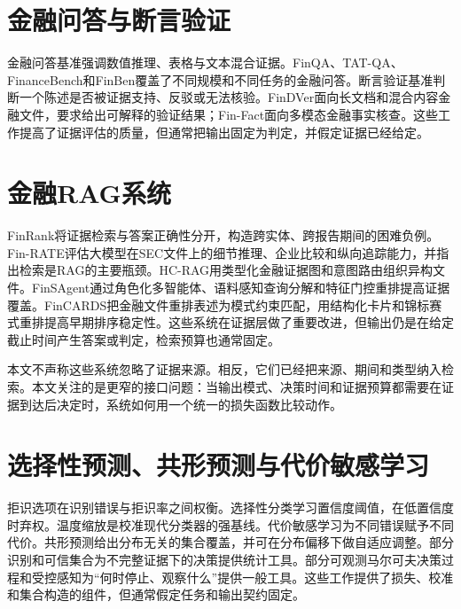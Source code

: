 \documentclass[12pt,openany]{ctexbook}
\begin{document}
\section{金融问答与断言验证}
金融问答基准强调数值推理、表格与文本混合证据。FinQA、TAT-QA、FinanceBench和FinBen覆盖了不同规模和不同任务的金融问答\cite{chen2021finqa,zhu2021tatqa,islam2023financebench,liu2024finben}。断言验证基准判断一个陈述是否被证据支持、反驳或无法核验。FinDVer面向长文档和混合内容金融文件，要求给出可解释的验证结果\cite{zhao2024findver}；Fin-Fact面向多模态金融事实核查\cite{rangapur2025finfact}。这些工作提高了证据评估的质量，但通常把输出固定为判定，并假定证据已经给定。\par

\section{金融RAG系统}
FinRank将证据检索与答案正确性分开，构造跨实体、跨报告期间的困难负例\cite{mansouri2026finrank}。Fin-RATE评估大模型在SEC文件上的细节推理、企业比较和纵向追踪能力，并指出检索是RAG的主要瓶颈\cite{jiang2026finrate}。HC-RAG用类型化金融证据图和意图路由组织异构文件\cite{chen2026hcrag}。FinSAgent通过角色化多智能体、语料感知查询分解和特征门控重排提高证据覆盖\cite{chi2026finsagent}。FinCARDS把金融文件重排表述为模式约束匹配，用结构化卡片和锦标赛式重排提高早期排序稳定性\cite{chen2026fincards}。这些系统在证据层做了重要改进，但输出仍是在给定截止时间产生答案或判定，检索预算也通常固定。\par
本文不声称这些系统忽略了证据来源。相反，它们已经把来源、期间和类型纳入检索。本文关注的是更窄的接口问题：当输出模式、决策时间和证据预算都需要在证据到达后决定时，系统如何用一个统一的损失函数比较动作。\par

\section{选择性预测、共形预测与代价敏感学习}
拒识选项在识别错误与拒识率之间权衡\cite{chow1970optimum}。选择性分类学习置信度阈值，在低置信度时弃权\cite{geifman2017selective}。温度缩放是校准现代分类器的强基线\cite{guo2017calibration}。代价敏感学习为不同错误赋予不同代价\cite{elkan2001cost}。共形预测给出分布无关的集合覆盖\cite{vovk2005algorithmic,romano2020classification,angelopoulos2021gentle}，并可在分布偏移下做自适应调整\cite{gibbs2021adaptive}。部分识别和可信集合为不完整证据下的决策提供统计工具\cite{manski2003partial}。部分可观测马尔可夫决策过程和受控感知为“何时停止、观察什么”提供一般工具\cite{krishnamurthy2017pomdp}。这些工作提供了损失、校准和集合构造的组件，但通常假定任务和输出契约固定。\par
\end{document}
